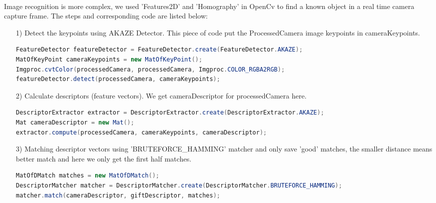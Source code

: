 \paragraph{}Image recognition is more complex, we used 'Features2D' and 'Homography' in OpenCv to find a known object in a real time camera capture frame. The steps and corresponding code are listed below:
\begin{enumerate}
\item[1)] Detect the keypoints using AKAZE Detector. This piece of code put the ProcessedCamera image keypoints in cameraKeypoints.
\begin{lstlisting}[language=JAVA] 
FeatureDetector featureDetector = FeatureDetector.create(FeatureDetector.AKAZE);
MatOfKeyPoint cameraKeypoints = new MatOfKeyPoint();
Imgproc.cvtColor(processedCamera, processedCamera, Imgproc.COLOR_RGBA2RGB);
featureDetector.detect(processedCamera, cameraKeypoints);
\end{lstlisting} 
\item[2)] Calculate descriptors (feature vectors). We get cameraDescriptor for processedCamera here.
\begin{lstlisting}[language=JAVA] 
DescriptorExtractor extractor = DescriptorExtractor.create(DescriptorExtractor.AKAZE);
Mat cameraDescriptor = new Mat();
extractor.compute(processedCamera, cameraKeypoints, cameraDescriptor);
\end{lstlisting} 
\item[3)] Matching descriptor vectors using 'BRUTEFORCE\_HAMMING' matcher and only save 'good' matches, the smaller distance means better match and here we only get the first half matches. 
\begin{lstlisting}[language=JAVA] 
MatOfDMatch matches = new MatOfDMatch();
DescriptorMatcher matcher = DescriptorMatcher.create(DescriptorMatcher.BRUTEFORCE_HAMMING);
matcher.match(cameraDescriptor, giftDescriptor, matches);
            

\end{lstlisting}
\end{enumerate}
